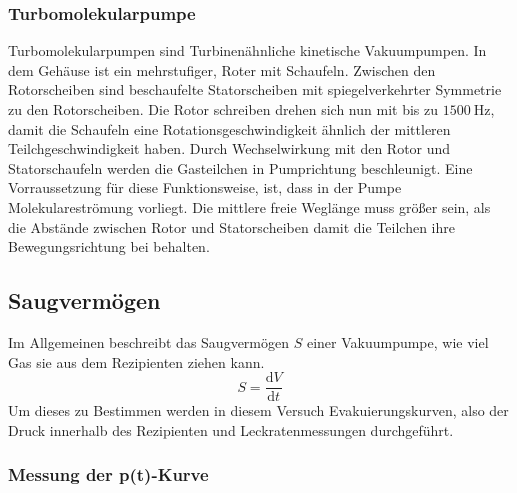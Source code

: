 			\cite{pfeiffer}
		\subsubsection{Turbomolekularpumpe}
		
			\noindent
			\cite{pfeiffer}
			Turbomolekularpumpen sind Turbinenähnliche kinetische Vakuumpumpen. 
			In dem Gehäuse ist ein mehrstufiger, Roter mit Schaufeln.
			Zwischen den Rotorscheiben sind beschaufelte Statorscheiben mit spiegelverkehrter Symmetrie zu den Rotorscheiben.
			Die Rotor schreiben drehen sich nun mit bis zu $\SI{1500}{\hertz}$, damit die Schaufeln eine Rotationsgeschwindigkeit ähnlich der mittleren Teilchgeschwindigkeit haben. 
			Durch Wechselwirkung mit den Rotor und Statorschaufeln werden die Gasteilchen in Pumprichtung beschleunigt.
			Eine Vorraussetzung für diese Funktionsweise, ist, dass in der Pumpe Molekulareströmung vorliegt. 
			Die mittlere freie Weglänge muss größer sein, als die Abstände zwischen Rotor und Statorscheiben damit die Teilchen ihre Bewegungsrichtung bei behalten. 
			  						
	\subsection{Saugvermögen}

			\noindent
		Im Allgemeinen beschreibt das Saugvermögen $S$ einer Vakuumpumpe, wie viel Gas sie aus dem Rezipienten ziehen kann. 
		\begin{equation}
			S = \frac{\text{d}V}{\text{d}t}
		\end{equation}
		Um dieses zu Bestimmen werden in diesem Versuch Evakuierungskurven, also der Druck innerhalb des Rezipienten und Leckratenmessungen durchgeführt.

		\subsubsection{Messung der p(t)-Kurve}
			
